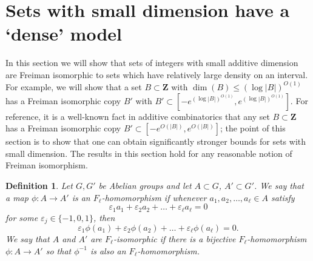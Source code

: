 \documentclass[11pt, reqno]{amsart}
\newtheorem{definition}[theorem]{Definition}
\begin{document}
\section{Sets with small dimension have a `dense' model}
In this section we will show that sets of integers with small additive dimension are Freiman isomorphic to sets which have relatively large density on an interval. For example, we will show that a set $B\subset \mathbf{Z}$ with $\dim(B)\leqslant (\log |B|)^{O(1)}$ has a Freiman isomorphic copy $B'$ with $B'\subset[-e^{(\log |B|)^{O(1)}},e^{(\log |B|)^{O(1)}}]$. For reference, it is a well-known fact in additive combinatorics that any set $B\subset \mathbf{Z}$ has a Freiman isomorphic copy $B'\subset[-e^{O(|B|)},e^{O(|B|)}]$; the point of this section is to show that one can obtain significantly stronger bounds for sets with small dimension. The results in this section hold for any reasonable notion of Freiman isomorphism.
\begin{definition}
Let $G,G'$ be Abelian groups and let $A\subset G$, $A'\subset G'$. We say that a map $\phi:A\to A'$ is an \textit{$F_\ell$-homomorphism} if whenever $a_1,a_2,\dots,a_\ell\in A$ satisfy $$\varepsilon_1a_1+\varepsilon_2a_2+\dots+\varepsilon_\ell a_\ell=0$$
for some $\varepsilon_j\in\{-1,0,1\}$,
then $$\varepsilon_1\phi(a_1)+\varepsilon_2\phi(a_2)+\dots+\varepsilon_\ell\phi(a_\ell)=0.$$ We say that $A$ and $A'$ are \textit{$F_\ell$-isomorphic} if there is a bijective $F_\ell$-homomorphism $\phi:A\to A'$ so that $\phi^{-1}$ is also an $F_\ell$-homomorphism.
\label{frei}
\end{definition}
\end{document}
